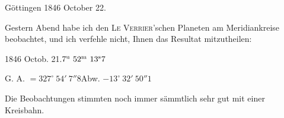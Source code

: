 \par{}\bigskip
\hypertarget{native-476-letter}{}
\begin{flushright}Göttingen 1846 October 22.\end{flushright}

Gestern Abend habe ich den \textsc{Le Verrier}'schen Planeten am Meridiankreise beobachtet, und ich verfehle nicht, Ihnen das Resultat mitzutheilen:

\begin{center}
1846 Octob. 21.\quad $7^{\rm u}\ 52^{\rm m}\ 13^{\rm s}7$\par
G. A. $=327^\circ\ 54'\ 7''8$\qquad Abw. $-13^\circ\ 32'\ 50''1$
\end{center}

Die Beobachtungen stimmten noch immer sämmtlich sehr gut mit einer Kreisbahn.
